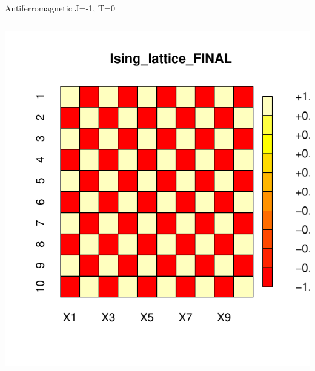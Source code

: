 \documentclass{beamer}
\begin{document}
\begin{frame}{Antiferromagnetic J=-1, T=0}
\begin{columns}
\begin{column}{0.5\textwidth}
\begin{center}
     \includegraphics[width=\textwidth]{Pic/J-1_10_6000_T=0_FINAL.pdf}
     \end{center}
\end{column}
\end{columns}
\end{frame}
\end{document}
